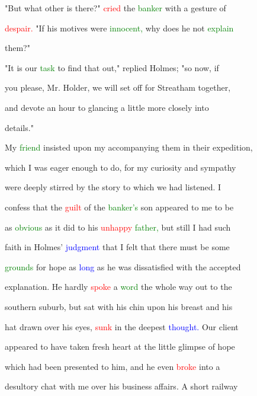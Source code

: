  "But what other is there?" \textcolor{red}{cried} the \textcolor{green}{banker} with a gesture of

 \textcolor{red}{despair.} "If his motives were \textcolor{green}{innocent,} why does he not \textcolor{green}{explain}

 them?"



 "It is our \textcolor{green}{task} to find that out," replied Holmes; "so now, if

 you please, Mr. Holder, we will set off for Streatham together,

 and devote an hour to glancing a little more closely into

 details."



 My \textcolor{green}{friend} insisted upon my accompanying them in their \textcolor{BurntOrange}{expedition,}

 which I was \textcolor{BurntOrange}{eager} enough to do, for my \textcolor{BurntOrange}{curiosity} and \textcolor{BurntOrange}{sympathy}

 were deeply stirred by the story to which we had listened. I

 \textcolor{BurntOrange}{confess} that the \textcolor{red}{guilt} of the \textcolor{green}{banker's} son appeared to me to be

 as \textcolor{green}{obvious} as it did to his \textcolor{red}{unhappy} \textcolor{green}{father,} but still I had such

 \textcolor{BurntOrange}{faith} in Holmes' \textcolor{blue}{judgment} that I felt that there must be some

 \textcolor{green}{grounds} for \textcolor{BurntOrange}{hope} as \textcolor{blue}{long} as he was dissatisfied with the accepted

 explanation. He hardly \textcolor{red}{spoke} a \textcolor{green}{word} the whole way out to the

 southern suburb, but sat with his chin upon his breast and his

 hat drawn over his eyes, \textcolor{red}{sunk} in the deepest \textcolor{blue}{thought.} Our client

 appeared to have taken fresh heart at the little glimpse of \textcolor{BurntOrange}{hope}

 which had been \textcolor{BurntOrange}{presented} to him, and he even \textcolor{red}{broke} into a

 desultory chat with me over his business affairs. A short railway

